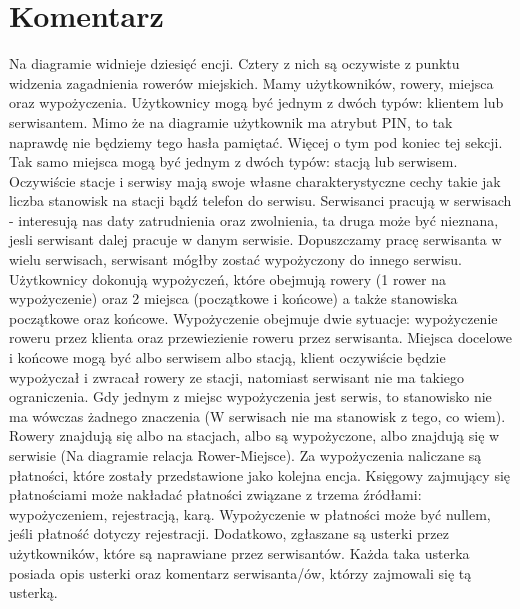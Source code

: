 \documentclass{article}
\begin{document}
\section{Komentarz}
Na diagramie widnieje dziesięć encji.
Cztery z nich są oczywiste z punktu widzenia zagadnienia rowerów miejskich.
Mamy użytkowników, rowery, miejsca oraz wypożyczenia.
Użytkownicy mogą być jednym z dwóch typów: klientem lub serwisantem. Mimo że na diagramie użytkownik
ma atrybut PIN, to tak naprawdę nie będziemy tego hasła pamiętać. Więcej o tym pod koniec tej sekcji.
Tak samo miejsca mogą być jednym z dwóch typów: stacją lub serwisem.
Oczywiście stacje i serwisy mają swoje własne charakterystyczne cechy takie jak liczba stanowisk
na stacji bądź telefon do serwisu.
Serwisanci pracują w serwisach - interesują nas daty zatrudnienia oraz zwolnienia,
ta druga może być nieznana, jesli serwisant dalej pracuje w danym serwisie.
Dopuszczamy pracę serwisanta w wielu serwisach, serwisant mógłby zostać wypożyczony do innego serwisu.
\newline
\newline
Użytkownicy dokonują wypożyczeń, które obejmują rowery (1 rower na wypożyczenie)
oraz 2 miejsca (początkowe i końcowe) a także stanowiska początkowe oraz końcowe.
Wypożyczenie obejmuje dwie sytuacje: wypożyczenie roweru przez klienta oraz przewiezienie roweru przez serwisanta.
Miejsca docelowe i końcowe mogą być albo serwisem albo stacją,
klient oczywiście będzie wypożyczał i zwracał rowery ze stacji, natomiast serwisant nie ma takiego ograniczenia.
Gdy jednym z miejsc wypożyczenia jest serwis,
to stanowisko nie ma wówczas żadnego znaczenia (W serwisach nie ma stanowisk z tego, co wiem).
\newline
\newline
Rowery znajdują się albo na stacjach, albo są wypożyczone, albo znajdują się w serwisie
(Na diagramie relacja Rower-Miejsce).
Za wypożyczenia naliczane są płatności, które zostały przedstawione jako kolejna encja.
Księgowy zajmujący się płatnościami może nakładać płatności
związane z trzema źródłami: wypożyczeniem, rejestracją, karą.
Wypożyczenie w płatności może być nullem, jeśli płatność dotyczy rejestracji.
\newline
\newline
Dodatkowo, zgłaszane są usterki przez użytkowników, które są naprawiane przez serwisantów.
Każda taka usterka posiada opis usterki oraz komentarz serwisanta/ów, którzy zajmowali się tą usterką.
\newline
\newline
\end{document}
